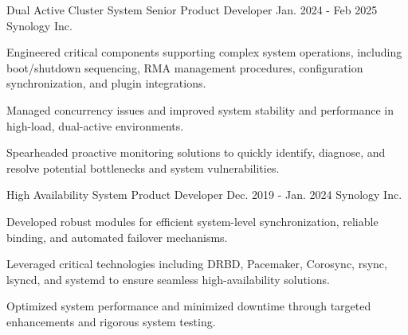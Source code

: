 
\begin{cventries}

  \cventry
    {Dual Active Cluster System} %
    {Senior Product Developer} %
    {Jan. 2024 - Feb 2025} %
    {Synology Inc.} %
    {
      \begin{cvitems} %
        \item {Engineered critical components supporting complex system operations, including boot/shutdown sequencing, RMA management procedures, configuration synchronization, and plugin integrations.}
        \item {Managed concurrency issues and improved system stability and performance in high-load, dual-active environments.}
        \item {Spearheaded proactive monitoring solutions to quickly identify, diagnose, and resolve potential bottlenecks and system vulnerabilities.}
      \end{cvitems}
    }

\vspace{0.5em}
  \cventry
    {High Availability System} %
    {Product Developer} %
    {Dec. 2019 - Jan. 2024} %
    {Synology Inc.} %
    {
      \begin{cvitems} %
        \item {Developed robust modules for efficient system-level synchronization, reliable binding, and automated failover mechanisms.}
        \item {Leveraged critical technologies including DRBD, Pacemaker, Corosync, rsync, lsyncd, and systemd to ensure seamless high-availability solutions.}
        \item {Optimized system performance and minimized downtime through targeted enhancements and rigorous system testing.}
      \end{cvitems}
    }


\end{cventries}
